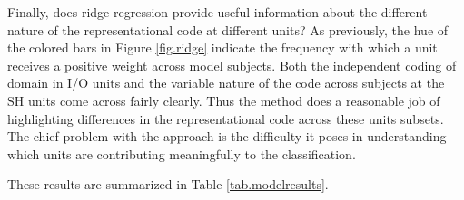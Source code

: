 Finally, does ridge regression provide useful information about the different nature of the representational code at different units? As previously, the hue of the colored bars in Figure \ref{fig.ridge} indicate the frequency with which a unit receives a positive weight across model subjects. Both the independent coding of domain in I/O units and the variable nature of the code across subjects at the SH units come across fairly clearly. Thus the method does a reasonable job of highlighting differences in the representational code across these units subsets. The chief problem with the approach is the difficulty it poses in understanding which units are contributing meaningfully to the classification. 

These results are summarized in Table \ref{tab.modelresults}.

%
%
%
